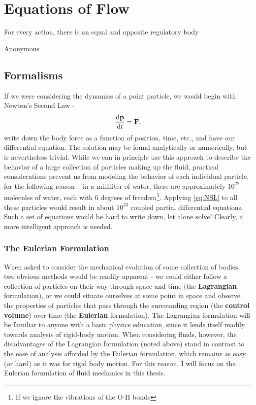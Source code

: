 \setcounter{secnumdepth}{3}
\chapter{Equations of Flow}
    	 	\epigraph{For every action, there is an equal and opposite regulatory body}{Anonymous}
\section{Formalisms}
If we were considering the dynamics of a point particle, we would begin with Newton's Second Law - 
\begin{equation}\label{eq:NSL}
\der{1}{\Vector{p}}{t} = \Vector{F}, 
\end{equation}
write down the body force as a function of position, time, etc., and have our differential equation. The solution may be found analytically or numerically, but is nevertheless trivial. While we can in principle use this approach to describe the behavior of a large collection of particles making up the fluid, practical considerations prevent us from modeling the behavior of each individual particle, for the following reason -- in a milliliter of water, there are approximately $10^{22}$ molecules of water, each with 6 degrees of freedom\footnote{If we ignore the vibrations of the O-H bonds}. Applying \eqref{eq:NSL} to all these particles would result in about $10^{23}$ coupled partial differential equations. Such a set of equations would be hard to write down, let alone solve! Clearly, a more intelligent approach is needed. \\

\subsection{The Eulerian Formulation}

When asked to consider the mechanical evolution of some collection of bodies, two obvious methods would be readily apparent - we could either follow a collection of particles on their way through space and time (the {\bf Lagrangian} formulation), or we could situate ourselves at some point in space and observe the properties of particles that pass through the surrounding region (the {\bf control volume}) over time (the {\bf Eulerian} formulation). The Lagrangian formulation will be familiar to anyone with a basic physics education, since it lends itself readily towards analysis of rigid-body motion. When considering fluids, however, the disadvantages of the Lagrangian formulation (noted above) stand in contrast to the ease of analysis afforded by the Eulerian formulation, which remains as easy (or hard) as it was for rigid body motion. For this reason, I will focus on the Eulerian formulation of fluid mechanics in this thesis. 

